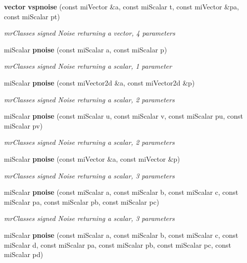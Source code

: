 \begin{CompactItemize}
{\bf vector} {\bf vspnoise} (const mi\-Vector \&a, const mi\-Scalar t, const mi\-Vector \&pa, const mi\-Scalar pt)
\begin{CompactList}\small\item\em mr\-Classes signed Noise returning a vector, 4 parameters \item\end{CompactList}\item 
mi\-Scalar {\bf pnoise} (const mi\-Scalar a, const mi\-Scalar p)
\begin{CompactList}\small\item\em mr\-Classes signed Noise returning a scalar, 1 parameter \item\end{CompactList}\item 
mi\-Scalar {\bf pnoise} (const mi\-Vector2d \&a, const mi\-Vector2d \&p)
\begin{CompactList}\small\item\em mr\-Classes signed Noise returning a scalar, 2 parameters \item\end{CompactList}\item 
mi\-Scalar {\bf pnoise} (const mi\-Scalar u, const mi\-Scalar v, const mi\-Scalar pu, const mi\-Scalar pv)
\begin{CompactList}\small\item\em mr\-Classes signed Noise returning a scalar, 2 parameters \item\end{CompactList}\item 
mi\-Scalar {\bf pnoise} (const mi\-Vector \&a, const mi\-Vector \&p)
\begin{CompactList}\small\item\em mr\-Classes signed Noise returning a scalar, 3 parameters \item\end{CompactList}\item 
mi\-Scalar {\bf pnoise} (const mi\-Scalar a, const mi\-Scalar b, const mi\-Scalar c, const mi\-Scalar pa, const mi\-Scalar pb, const mi\-Scalar pc)
\begin{CompactList}\small\item\em mr\-Classes signed Noise returning a scalar, 3 parameters \item\end{CompactList}\item 
mi\-Scalar {\bf pnoise} (const mi\-Scalar a, const mi\-Scalar b, const mi\-Scalar c, const mi\-Scalar d, const mi\-Scalar pa, const mi\-Scalar pb, const mi\-Scalar pc, const mi\-Scalar pd)

\end{CompactItemize}

